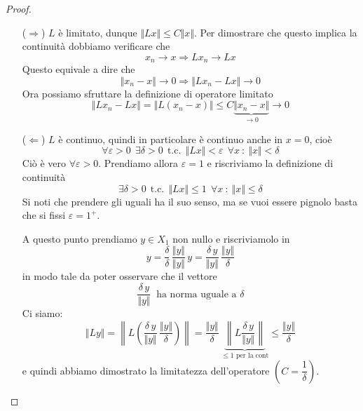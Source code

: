 \begin{proof}\leavevmode
\begin{enumerate}
    \item [($\Rightarrow$)] $L$ è limitato, dunque $\Vert Lx\Vert\leq C\Vert x \Vert$. Per dimostrare che questo implica la continuità dobbiamo verificare che 
    \begin{equation*}
    x_n \to x \Rightarrow Lx_n\to Lx
    \end{equation*}
    Questo equivale a dire che
    \begin{equation*}
    \Vert x_n - x \Vert \to 0 \Rightarrow \Vert Lx_n- Lx\Vert \to 0
    \end{equation*}
    Ora possiamo sfruttare la definizione di operatore limitato
    \begin{equation*}
    \Vert Lx_n- Lx\Vert=\Vert L(x_n-x)\Vert \leq C \underbrace{\Vert x_n - x \Vert}_{\to 0}\to 0
    \end{equation*}

    \item [($\Leftarrow$)] $L$ è continuo, quindi in particolare è continuo anche in $x=0$, cioè
    \begin{equation*}
    \forall \varepsilon>0\ \ \exists \delta>0\ \ \text{t.c.}\ \ \Vert Lx\Vert<\varepsilon\ \ \forall x\ :\ \Vert x\Vert <\delta
    \end{equation*}
    Ciò è vero $\forall \varepsilon>0$. Prendiamo allora $\varepsilon=1$ e riscriviamo la definizione di continuità
    \begin{equation*}
    \exists \delta>0\ \ \text{t.c.}\ \ \Vert Lx\Vert\leq 1\ \ \forall x\ :\ \Vert x\Vert \leq \delta
    \end{equation*}
    Si noti che prendere gli uguali ha il suo senso, ma se vuoi essere pignolo basta che si fissi $\varepsilon=1^+$.

    A questo punto prendiamo $y\in X_1$ non nullo e riscriviamolo in
    \begin{equation*}
    y=\frac{\delta}{\delta}\,\frac{\Vert y \Vert}{\Vert y \Vert}\, y=\frac{\delta\, y}{\Vert y \Vert}\,\frac{\Vert y \Vert}{\delta}
    \end{equation*}
    in modo tale da poter osservare che il vettore 
    \begin{equation*}
    \frac{\delta\, y}{\Vert y \Vert}\ \text{ ha norma uguale a }\delta
    \end{equation*}
    Ci siamo:
    \begin{equation*}
    \Vert Ly\Vert =\left\| L \left(\frac{\delta\, y}{\Vert y \Vert}\,\frac{\Vert y \Vert}{\delta}\right)\right\|=\frac{\Vert y \Vert}{\delta}\ \underbrace{\left\| L\frac{\delta\, y}{\Vert y \Vert}\right\|}_{\leq 1\text{ per la cont}}\leq \frac{\Vert y \Vert}{\delta}
    \end{equation*}
    e quindi abbiamo dimostrato la limitatezza dell'operatore $\left(C=\dfrac{1}{\delta}\right)$.
\end{enumerate}
\end{proof}

